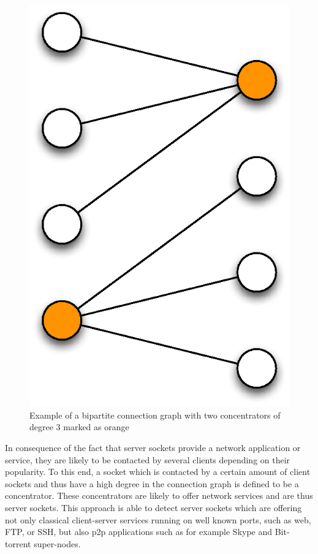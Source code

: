 \begin{figure}
	[h] \centering
	\includegraphics[width=\linewidth/3]{images/connection_graph.eps} \caption{Example of a bipartite connection graph with two concentrators of degree 3 marked as orange}
	\label{fig:bipartite_graph}
\end{figure}

In consequence of the fact that \glspl{server socket} provide a network application or service, they are likely to be contacted by several clients depending on their popularity. To this end, a socket which is contacted by a certain amount of client sockets and thus have a high degree in the connection graph is defined to be a concentrator. These concentrators are likely to offer network services and are thus \glspl{server socket}. This approach is able to detect \glspl{server socket} which are offering not only classical client-server services running on well known ports, such as web, \gls{FTP}, or \gls{SSH}, but also \gls{p2p} applications such as for example Skype and Bit-torrent super-nodes.

